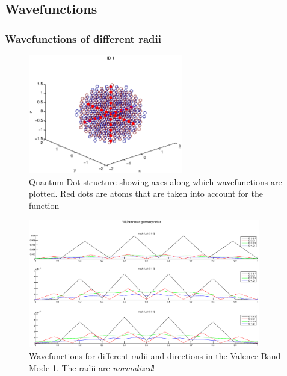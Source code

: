 \documentclass[a4paper, 11pt, landscape]{article}
\begin{document}
		\newpage
		\subsection{Wavefunctions}
		\subsubsection*{Wavefunctions of different radii}
			\begin{figure}[htbp]
				\centering
				\includegraphics[width=0.6\textwidth]{figures/gridPlotAxis.eps}
				\caption{Quantum Dot structure showing axes along which wavefunctions are plotted.
								 Red dots are atoms that are taken into account for the function}
			\end{figure}
		
			\begin{figure}[htbp]
				\centering
				\includegraphics[width=0.9\textwidth]{figures/EVPlot3AxesMod1.eps}
				\caption{Wavefunctions for different radii and directions in the Valence Band Mode 1. The radii are {\it normalized}!}
			\end{figure}
			
\end{document}
